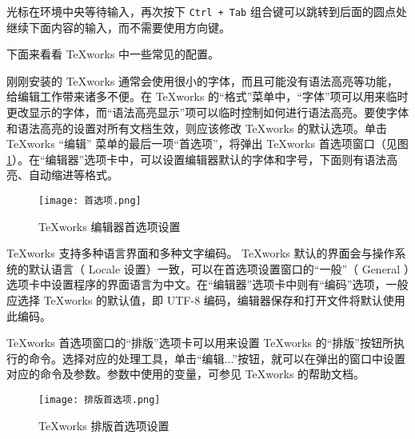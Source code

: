 光标在环境中央等待输入，再次按下 \verb|Ctrl + Tab| 组合键可以跳转到后面的圆点处继续下面内容的输入，而不需要使用方向键。

下面来看看 TeXworks 中一些常见的配置。

刚刚安装的 TeXworks 通常会使用很小的字体，而且可能没有语法高亮等功能，给编辑工作带来诸多不便。在 TeXworks 的“格式”菜单中，“字体”项可以用来临时更改显示的字体，而“语法高亮显示”项可以临时控制如何进行语法高亮。要使字体和语法高亮的设置对所有文档生效，则应该修改 TeXworks 的默认选项。单击 TeXworks “编辑” 菜单的最后一项“首选项”，将弹出 TeXworks 首选项窗口（见图\ref{fig:3}）。在“编辑器”选项卡中，可以设置编辑器默认的字体和字号，下面则有语法高亮、自动缩进等格式。

\begin{figure}[H]
    \centering
    \texttt{[image: 首选项.png]}
    \caption{TeXworks 编辑器首选项设置}
    \label{fig:3}
\end{figure}

TeXworks 支持多种语言界面和多种文字编码。 TeXworks 默认的界面会与操作系统的默认语言（ Locale 设置）一致，可以在首选项设置窗口的“一般”（ General ）选项卡中设置程序的界面语言为中文。在“编辑器”选项卡中则有“编码”选项，一般应选择 TeXworks 的默认值，即 UTF-8 编码，编辑器保存和打开文件将默认使用此编码。

TeXworks 首选项窗口的“排版”选项卡可以用来设置 TeXworks 的“排版”按钮所执行的命令。选择对应的处理工具，单击“编辑...”按钮，就可以在弹出的窗口中设置对应的命令及参数。参数中使用的变量，可参见 TeXworks 的帮助文档。

\begin{figure}[H]
    \centering
    \texttt{[image: 排版首选项.png]}
    \caption{TeXworks 排版首选项设置}
    \label{fig:4}
\end{figure}

